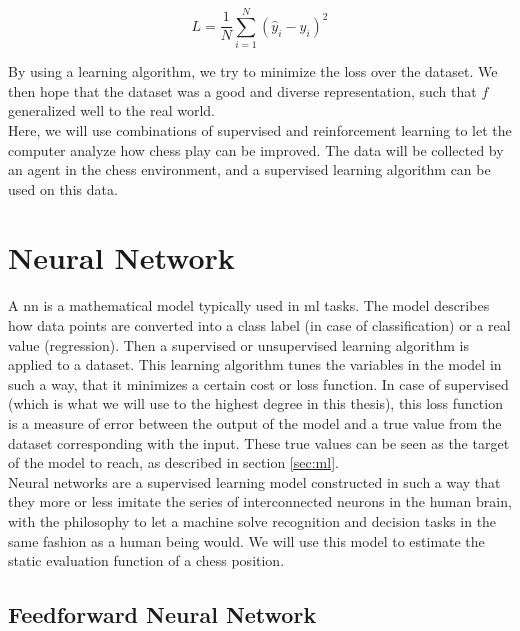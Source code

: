 \begin{equation}
L=\frac{1}{N}\sum_{i=1}^{N}\left(\hat{y}_i-y_i\right)^2
\label{eq:mse}
\end{equation}

By using a learning algorithm, we try to minimize the loss over the dataset. We then hope that the dataset was a good and diverse representation, such that $f$ generalized well to the real world.\\

Here, we will use combinations of supervised and reinforcement learning to let the computer analyze how chess play can be improved. The data will be collected by an agent in the chess environment, and a supervised learning algorithm can be used on this data.

\section{Neural Network}
\label{sec:nn}

A \acrlong{nn} is a mathematical model typically used in \gls{ml} tasks. The model describes how data points are converted into a class label (in case of classification) or a real value (regression). Then a supervised or unsupervised learning algorithm is applied to a dataset. This learning algorithm tunes the variables in the model in such a way, that it minimizes a certain cost or loss function. In case of supervised (which is what we will use to the highest degree in this thesis), this loss function is a measure of error between the output of the model and a true value from the dataset corresponding with the input. These true values can be seen as the target of the model to reach, as described in section \ref{sec:ml}. \\
Neural networks are a supervised learning model constructed in such a way that they more or less imitate the series of interconnected neurons in the human brain, with the philosophy to let a machine solve recognition and decision tasks in the same fashion as a human being would. We will use this model to estimate the static evaluation function of a chess position.\\

\subsection{Feedforward Neural Network}
\label{subsubsec:ann}

